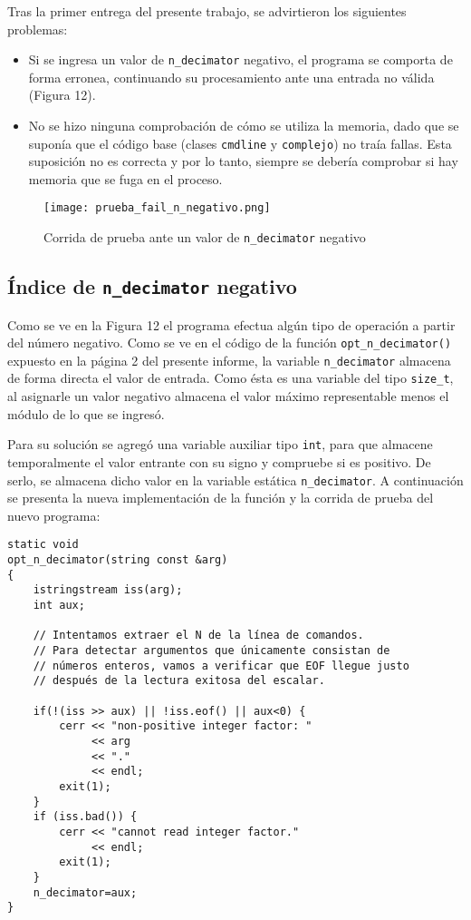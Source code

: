 
Tras la primer entrega del presente trabajo, se advirtieron los siguientes problemas:

	\begin{itemize}
		\item Si se ingresa un valor de \texttt{n\_decimator} negativo, el programa se comporta de forma erronea, continuando su procesamiento ante una entrada no válida (Figura 12).
		\item No se hizo ninguna comprobación de cómo se utiliza la memoria, dado que se suponía que el código base (clases \texttt{cmdline} y \texttt{complejo}) no traía fallas. Esta suposición no es correcta y por lo tanto, siempre se debería comprobar si hay memoria que se fuga en el proceso.
	\end{itemize}

	\begin{figure}[H]
		\centering
		\texttt{[image: prueba\_fail\_n\_negativo.png]}
		\label{graf:n_negativo}
		\caption{Corrida de prueba ante un valor de \texttt{n\_decimator} negativo}
	\end{figure}

\subsection{Índice de \texttt{n\_decimator} negativo}

	Como se ve en la Figura 12 el programa efectua algún tipo de operación a partir del número negativo. Como se ve en el código de la función \texttt{opt\_n\_decimator()} expuesto en la página 2 del presente informe, la variable \texttt{n\_decimator} almacena de forma directa el valor de entrada. Como ésta es una variable del tipo \texttt{size\_t}, al asignarle un valor negativo almacena el valor máximo representable menos el módulo de lo que se ingresó.

	Para su solución se agregó una variable auxiliar tipo \texttt{int}, para que almacene temporalmente el valor entrante con su signo y compruebe si es positivo. De serlo, se almacena dicho valor en la variable estática \texttt{n\_decimator}. A continuación se presenta la nueva implementación de la función y la corrida de prueba del nuevo programa:

	\begin{lstlisting}[frame=single]
static void
opt_n_decimator(string const &arg)
{
	istringstream iss(arg);
	int aux;

	// Intentamos extraer el N de la línea de comandos.
	// Para detectar argumentos que únicamente consistan de
	// números enteros, vamos a verificar que EOF llegue justo
	// después de la lectura exitosa del escalar.
	
	if(!(iss >> aux) || !iss.eof() || aux<0) {
		cerr << "non-positive integer factor: "
		     << arg
		     << "."
		     << endl;
		exit(1);
	}
	if (iss.bad()) {
		cerr << "cannot read integer factor."
		     << endl;
		exit(1);
	}
	n_decimator=aux;
}
	\end{lstlisting}

